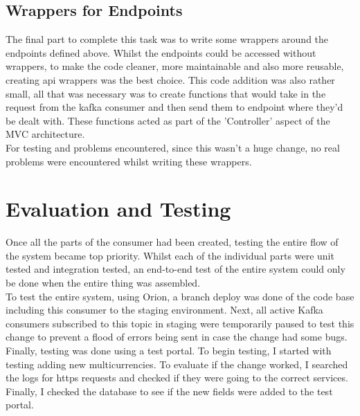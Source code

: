 \subsection{Wrappers for Endpoints}
The final part to complete this task was to write some wrappers around the endpoints defined above.  Whilst the endpoints could be accessed without wrappers,  to make the code cleaner,  more maintainable and also more reusable,  creating api wrappers was the best choice.  \newline
This code addition was also rather small,  all that was necessary was to create functions that would take in the request from the kafka consumer and then send them to endpoint where they'd be dealt with.  These functions acted as part of the 'Controller' aspect of the MVC architecture.  \newline \\ For testing and problems encountered, since this wasn't a huge change, no real problems were encountered whilst writing these wrappers. 

\section{Evaluation and Testing}
Once all the parts of the consumer had been created,  testing the entire flow of the system became top priority.  Whilst each of the individual parts were unit tested and integration tested,  an end-to-end test of the entire system could only be done when the entire thing was assembled.  \newline \\ To test the entire system,  using Orion,  a branch deploy was done of the code base including this consumer to the staging environment.  Next,  all active Kafka consumers subscribed to this topic in staging were temporarily paused to test this change to prevent a flood of errors being sent in case the change had some bugs.  Finally,  testing was done using a test portal. \newline To begin testing,  I started with testing adding new multicurrencies.  To evaluate if the change worked,  I searched the logs for https requests and checked if they were going to the correct services.  Finally,  I checked the database to see if the new fields were added to the test portal.

